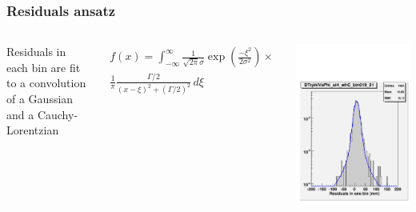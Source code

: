 \documentclass[compress]{beamer}
\begin{document}

\begin{frame}
\frametitle{Residuals ansatz}

\begin{columns}
Residuals in each bin are fit to a convolution of a Gaussian and a
Cauchy-Lorentzian

\begin{multline*}
f(x) = \int_{-\infty}^\infty \frac{1}{\sqrt{2\pi} \sigma} \exp\left(\frac{-\xi^2}{2 \sigma^2}\right) \times \\
\frac{1}{\pi}\frac{\Gamma/2}{(x - \xi)^2 + (\Gamma/2)^2} \, d\xi
\end{multline*}

\includegraphics[width=\linewidth]{fitfunction.pdf}
\end{columns}


\end{frame}
\end{document}
